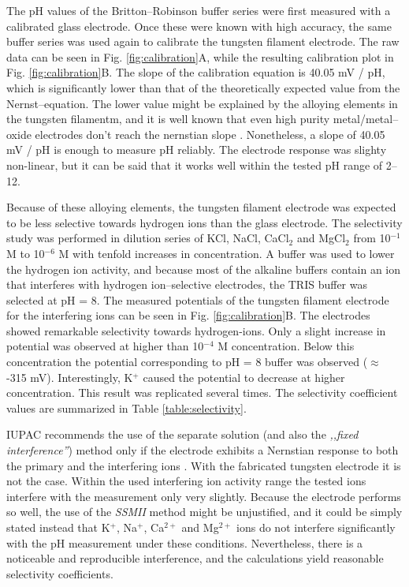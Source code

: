\documentclass[manuscript=article, journal=jceda8]{achemso}
\begin{document}
The pH values of the Britton--Robinson buffer series were first measured with a calibrated glass electrode. Once these were known with high accuracy, the same buffer series was used again to calibrate the tungsten filament electrode. The raw data can be seen in Fig. \ref{fig:calibration}A, while the resulting calibration plot in Fig. \ref{fig:calibration}B. The slope of the calibration equation is 40.05 mV / pH, which is significantly lower than that of the theoretically expected value from the Nernst--equation. The lower value might be explained by the alloying elements in the tungsten filamentm, and it is well known that even high purity metal/metal--oxide electrodes don't reach the nernstian slope \cite{kriksunov1994tungsten, midgley1990review}. Nonetheless, a slope of 40.05 mV / pH is enough to measure pH reliably. The electrode response was slighty non-linear, but it can be said that it works well within the tested pH range of 2--12.

Because of these alloying elements, the tungsten filament electrode was expected to be less selective towards hydrogen ions than the glass electrode. The selectivity study was performed in dilution series of KCl, NaCl, CaCl$_2$ and MgCl$_2$ from 10$^{-1}$ M to 10$^{-6}$ M with tenfold increases in concentration. A buffer was used to lower the hydrogen ion activity, and because most of the alkaline buffers contain an ion that interferes with hydrogen ion--selective electrodes, the TRIS buffer was selected at pH = 8.
The measured potentials of the tungsten filament electrode for the interfering ions can be seen in Fig. \ref{fig:calibration}B. The electrodes showed remarkable selectivity towards hydrogen-ions. Only a slight increase in potential was observed at higher than 10$^{-4}$ M concentration. Below this concentration the potential corresponding to pH = 8 buffer was observed ($\approx$ -315 mV). Interestingly, K$^+$ caused the potential to decrease at higher concentration. This result was replicated several times. The selectivity coefficient values are summarized in Table \ref{table:selectivity}.

IUPAC recommends the use of the separate solution (and also the \emph{,,fixed interference''}) method only if the electrode exhibits a Nernstian response to both the primary and the interfering ions \cite{buck1994recommendations}. With the fabricated tungsten electrode it is not the case. Within the used interfering ion activity range the tested ions interfere with the measurement only very slightly. Because the electrode performs so well, the use of the \emph{SSMII} method might be unjustified, and it could be simply stated instead that K$^+$, Na$^+$, Ca$^{2+}$ and Mg$^{2+}$ ions do not interfere significantly with the pH measurement under these conditions. Nevertheless, there is a noticeable and reproducible interference, and the calculations yield reasonable selectivity coefficients.
\end{document}

